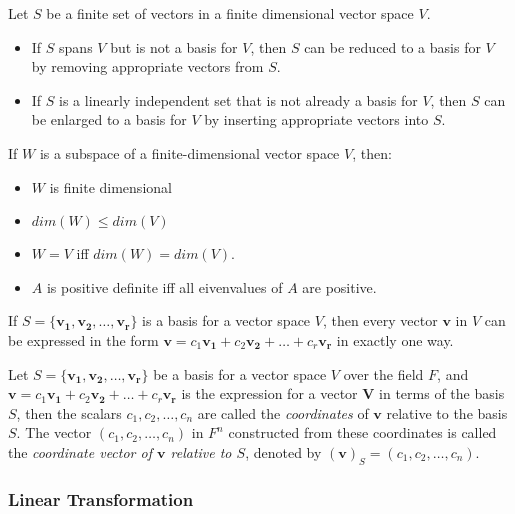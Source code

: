 \documentclass{report}
\begin{document}
		\begin{thm}
			Let $S$ be a finite set of vectors in a finite dimensional vector space $V$.
			\begin{itemize}
				\item If $S$ spans $V$ but is not a basis for $V$, then $S$ can be reduced to a basis for $V$ by removing appropriate vectors from $S$.
				\item If $S$ is a linearly independent set that is not already a basis for $V$, then $S$ can be enlarged to a basis for $V$ by inserting appropriate vectors into $S$.
			\end{itemize}
		\end{thm}
		
		\begin{thm}
			If $W$ is a subspace of a finite-dimensional vector space $V$, then:
			\begin{itemize}
				\item $W$ is finite dimensional
				\item $dim(W) \le dim(V)$
				\item $W=V$ iff $dim(W)=dim(V)$.				\item $A$ is positive definite iff all eivenvalues of $A$ are positive.
			\end{itemize}
		\end{thm}
	
		\begin{thm}\label{thm_coordinate_unique}
			If $S=\{\bm{v_1}, \bm{v_2}, \dots, \bm{v_r}\}$ is a basis for a vector space $V$, then every vector $\bm{v}$ in $V$ can be expressed in the form $\bm{v}=c_1\bm{v_1}+c_2\bm{v_2}+\dots+c_r\bm{v_r}$ in exactly one way.
		\end{thm}
	
		\begin{defn}[Coordinate]\label{def_coordinate}
			Let $S=\{\bm{v_1}, \bm{v_2}, \dots, \bm{v_r}\}$ be a basis for a vector space $V$ over the field $F$, and $\bm{v}=c_1\bm{v_1}+c_2\bm{v_2}+\dots+c_r\bm{v_r}$ is the expression for a vector $\bm{V}$ in terms of the basis $S$, then the scalars $c_1,c_2,\dots,c_n$ are called the \emph{coordinates} of $\bm{v}$ relative to the basis $S$. The vector $(c_1,c_2,\dots,c_n)$ in $F^n$ constructed from these coordinates is called the \emph{coordinate vector of $\bm{v}$ relative to $S$}, denoted by $(\bm{v})_S=(c_1,c_2,\dots,c_n)$.
		\end{defn}
		
		\subsubsection{Linear Transformation}
		
\end{document}
